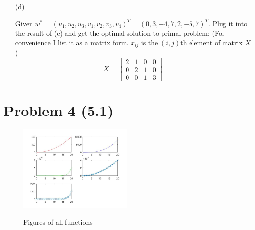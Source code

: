 \documentclass[12pt]{article}
\begin{document}
\begin{enumerate}
\item[(d)]

Given $w^* = (u_1, u_2, u_3, v_1, v_2, v_3, v_4)^T = (0, 3, -4, 7, 2, -5, 7)^T$. Plug it into the result of (c) and get the optimal solution to primal problem: (For convenience I list it as a matrix form. $x_{ij}$ is the $(i, j)$th element of matrix $X$)
$$
X = \begin{bmatrix}
2 & 1 & 0 & 0 \\
0 & 2 & 1 & 0 \\
0 & 0 & 1 & 3
\end{bmatrix}
$$

\end{enumerate}


\section*{Problem 4 (5.1)}

\begin{figure}[htbp]
  \caption{Figures of all functions}
  \centering
    \includegraphics[width=0.5\textwidth]{Fig1.jpg}
    \label{fig1}
\end{figure}
\end{document}
